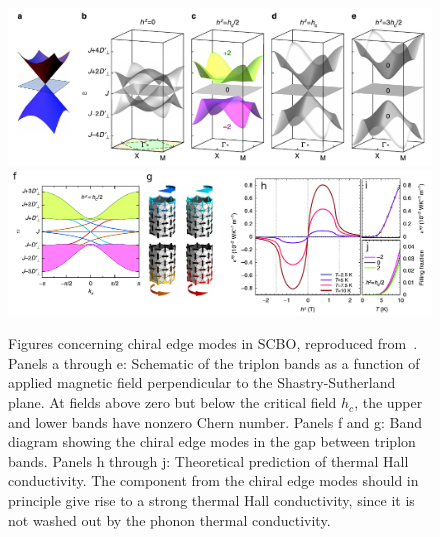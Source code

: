 \documentclass{thesis-umich}
\begin{document}
\begin{figure}
	\centering
	\caption[Chiral Edge Modes in SCBO]{Figures concerning chiral edge modes in SCBO, reproduced from~\cite{Romhanyi2015}. Panels a through e: Schematic of the triplon bands as a function of applied magnetic field perpendicular to the Shastry-Sutherland plane. At fields above zero but below the critical field $h_c$, the upper and lower bands have nonzero Chern number. Panels f and g: Band diagram showing the chiral edge modes in the gap between triplon bands. Panels h through j: Theoretical prediction of thermal Hall conductivity. The component from the chiral edge modes should in principle give rise to a strong thermal Hall conductivity, since it is not washed out by the phonon thermal conductivity.}
	\label{fig:scbo_edge_modes}
	\includegraphics[width=\columnwidth]{figures/SCBO_triplon_bands_Romhanyi.pdf}
	\includegraphics[width=\columnwidth]{figures/SCBO_edge_modes_Romhanyi.pdf}
\end{figure}
\end{document}
